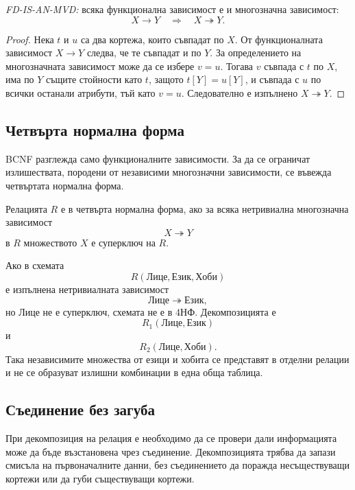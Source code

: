 \begin{prop}
\emph{FD-IS-AN-MVD:} всяка функционална зависимост е и многозначна зависимост:
\[
X\to Y\quad\Longrightarrow\quad X\twoheadrightarrow Y.
\]
\end{prop}

\begin{proof}
Нека $t$ и $u$ са два кортежа, които съвпадат по $X$. От функционалната зависимост $X\to Y$ следва, че те съвпадат и по $Y$. За определението на многозначната зависимост може да се избере $v=u$. Тогава $v$ съвпада с $t$ по $X$, има по $Y$ същите стойности като $t$, защото $t[Y]=u[Y]$, и съвпада с $u$ по всички останали атрибути, тъй като $v=u$. Следователно е изпълнено $X\twoheadrightarrow Y$.
\end{proof}

\subsection{Четвърта нормална форма}\label{s:24.1.12}

BCNF разглежда само функционалните зависимости. За да се ограничат излишествата, породени от независими многозначни зависимости, се въвежда четвъртата нормална форма.

\begin{defn}
Релацията $R$ е в четвърта нормална форма, ако за всяка нетривиална многозначна зависимост
\[
X\twoheadrightarrow Y
\]
в $R$ множеството $X$ е суперключ на $R$.
\end{defn}

Ако в схемата
\[
R(\mathrm{Лице},\mathrm{Език},\mathrm{Хоби})
\]
е изпълнена нетривиалната зависимост
\[
\mathrm{Лице}\twoheadrightarrow\mathrm{Език},
\]
но $\mathrm{Лице}$ не е суперключ, схемата не е в 4НФ. Декомпозицията е
\[
R_1(\mathrm{Лице},\mathrm{Език})
\]
и
\[
R_2(\mathrm{Лице},\mathrm{Хоби}).
\]
Така независимите множества от езици и хобита се представят в отделни релации и не се образуват излишни комбинации в една обща таблица.

\subsection{Съединение без загуба}\label{s:24.1.13}

При декомпозиция на релация е необходимо да се провери дали информацията може да бъде възстановена чрез съединение. Декомпозицията трябва да запази смисъла на първоначалните данни, без съединението да поражда несъществуващи кортежи или да губи съществуващи кортежи.

